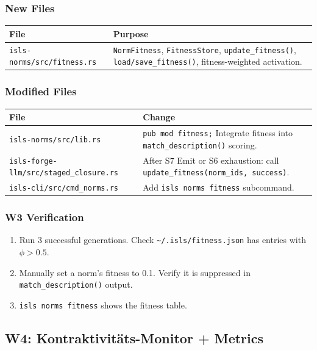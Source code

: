 \documentclass[11pt,a4paper]{article}
\begin{document}
\subsubsection{New Files}

\begin{longtable}{lp{10cm}}
\toprule
\textbf{File} & \textbf{Purpose} \\
\midrule
\texttt{isls-norms/src/fitness.rs}
  & \texttt{NormFitness}, \texttt{FitnessStore}, 
    \texttt{update\_fitness()}, \texttt{load/save\_fitness()},
    fitness-weighted activation. \\
\bottomrule
\end{longtable}

\subsubsection{Modified Files}

\begin{longtable}{lp{10cm}}
\toprule
\textbf{File} & \textbf{Change} \\
\midrule
\texttt{isls-norms/src/lib.rs}
  & \texttt{pub mod fitness;} Integrate fitness into 
    \texttt{match\_description()} scoring. \\
\texttt{isls-forge-llm/src/staged\_closure.rs}
  & After S7 Emit or S6 exhaustion: call 
    \texttt{update\_fitness(norm\_ids, success)}. \\
\texttt{isls-cli/src/cmd\_norms.rs}
  & Add \texttt{isls norms fitness} subcommand. \\
\bottomrule
\end{longtable}

\subsubsection{W3 Verification}

\begin{enumerate}[nosep]
\item Run 3 successful generations. Check 
      \texttt{\textasciitilde/.isls/fitness.json} has entries 
      with $\phi > 0.5$.
\item Manually set a norm's fitness to 0.1. Verify it is 
      suppressed in \texttt{match\_description()} output.
\item \texttt{isls norms fitness} shows the fitness table.
\end{enumerate}


\subsection{W4: Kontraktivit\"ats-Monitor + Metrics}
\end{document}
